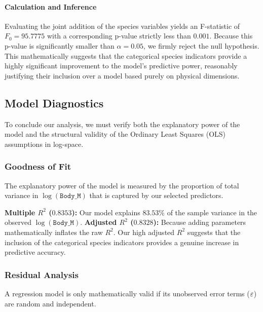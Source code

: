 \documentclass[12pt]{article}
\begin{document}
  \paragraph{Calculation and Inference}
  Evaluating the joint addition of the species variables
  yields an F-statistic of $F_0 = 95.7775$ with a
  corresponding p-value strictly less than $0.001$.
  Because this p-value is significantly
  smaller than $\alpha = 0.05$, we firmly reject the null
  hypothesis. This mathematically suggests that the categorical
  species indicators provide a highly significant improvement
  to the model's predictive power, reasonably justifying their
  inclusion over a model based purely on physical dimensions.


  \subsection{Model Diagnostics}
  \label{subsection:goodness_of_fit}

  To conclude our analysis, we must verify both the
  explanatory power of the model and the structural validity
  of the Ordinary Least Squares (OLS) assumptions in log-space.

  \subsubsection{Goodness of Fit}
  The explanatory power of the model is measured by the
  proportion of total variance in $\log(\texttt{Body\_M})$ that is
  captured by our selected predictors.
  \begin{itemize}
      \ii \textbf{Multiple $R^2$ ($0.8353$):} Our model explains
      $83.53\%$ of the sample variance in the observed
      $\log(\texttt{Body\_M})$.
      \ii \textbf{Adjusted $R^2$ ($0.8328$):} Because adding
      parameters mathematically inflates the raw $R^2$. Our high
      adjusted $R^2$ suggests that the inclusion of the categorical
      species indicators provides a genuine increase in predictive
      accuracy.
  \end{itemize}

  \subsubsection{Residual Analysis}
  A regression model is only mathematically valid if its
  unobserved error terms ($\varepsilon$) are random
  and independent.
\end{document}
